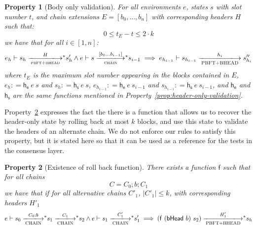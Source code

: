 \documentclass[11pt,a4paper]{article}
\newcommand{\fun}[1]{\mathsf{#1}}
\newcommand{\size}[1]{\left| #1 \right|}
\newcommand{\trans}[2]{\xlongrightarrow[\textsc{#1}]{#2}}
\newcommand{\leteq}{\ensuremath{\mathrel{\mathop:}=}}
\newcommand{\transtar}[2]{\xlongrightarrow[\textsc{#1}]{#2}\negthickspace^{*}}
\newtheorem{property}{Property}
\begin{document}
\begin{property}[Body only validation]\label{prop:body-only-validation}
  For all environments $e$, states $s$ with slot number $t$, and chain
  extensions $E = [b_0, \ldots, b_n]$ with corresponding headers $H$ such that:
  $$
  0 \leq t_E - t  \leq 2 \cdot k
  $$
  we have that for all $i \in [1, n]$:
  $$
  e_h \vdash s_h \transtar{pbft+bhead}{H} s'_h
  \wedge
  e \vdash s \transtar{chain}{[b_0 \ldots b_{i-1}]} s_{i-1}
  \implies
  e_{h_{i-1}} \vdash s_{h_{i-1}}\trans{PBFT+BHEAD}{h_i} s''_{h_{i}}
  $$
  where $t_E$ is the maximum slot number appearing in the blocks contained in
  $E$, $e_h \leteq \fun{h_e}~e~s$ and $s_h \leteq \fun{h_s}~e~s$,
  $e_{h_{i-1}} \leteq \fun{h_e}~e~s_{i-1}$ and
  $s_{h_{i-i}} \leteq \fun{h_s}~e~s_{i-1}$, and $\fun{h_e}$ and $\fun{h_s}$ are
  the same functions mentioned in Property~\ref{prop:header-only-validation}.
\end{property}

Property~\ref{prop:roll-back-funk} expresses the fact the there is a function
that allows us to recover the header-only state by rolling back at most $k$
blocks, and use this state to validate the headers of an alternate chain. We do
not enforce our rules to satisfy this property, but it is stated here so that
it can be used as a reference for the tests in the consensus layer.

\begin{property}[Existence of roll back function]\label{prop:roll-back-funk}
  There exists a function $\fun{f}$ such that for all chains
  $$C = C_0 ; b; C_1$$
  we have that if for all alternative chains $C'_1$, $\size{C'_1} \leq k$, with
  corresponding headers $H'_1$
  $$
  e \vdash s_0 \transtar{CHAIN}{C_0;b} s_1 \transtar{CHAIN}{C_1} s_2
  \wedge
  e \vdash s_1 \transtar{CHAIN}{C_1'} s'_1
  \implies
  (\fun{f}~(\bhead{b})~s_2) \transtar{PBFT+BHEAD}{H'_1} s_h
  $$
\end{property}

\clearpage



\end{document}
